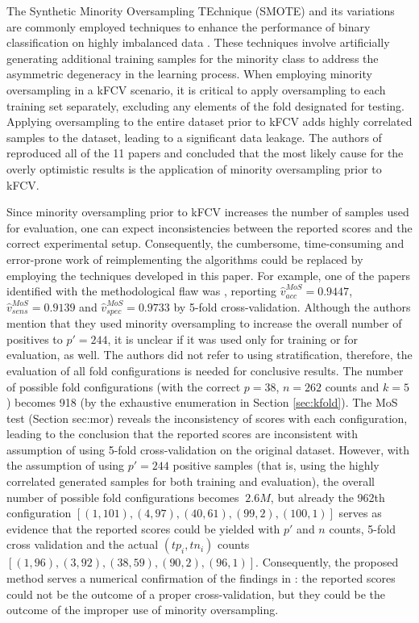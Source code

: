 \documentclass[3p, times]{elsarticle}
\begin{document}
The Synthetic Minority Oversampling TEchnique (SMOTE) \cite{smote} and its variations are commonly employed techniques to enhance the performance of binary classification on highly imbalanced data \cite{add2}. These techniques involve artificially generating additional training samples for the minority class to address the asymmetric degeneracy in the learning process. When employing minority oversampling in a kFCV scenario, it is critical to apply oversampling to each training set separately, excluding any elements of the fold designated for testing. Applying oversampling to the entire dataset prior to kFCV adds highly correlated samples to the dataset, leading to a significant data leakage. The authors of \cite{ehg} reproduced all of the 11 papers and concluded that the most likely cause for the overly optimistic results is the application of minority oversampling prior to kFCV.

Since minority oversampling prior to kFCV increases the number of samples used for evaluation, one can expect inconsistencies between the reported scores and the correct experimental setup. Consequently, the cumbersome, time-consuming and error-prone work of reimplementing the algorithms could be replaced by employing the techniques developed in this paper. For example, one of the papers identified with the methodological flaw was \cite{ehgflaw2}, reporting $\hat{v}_{acc}^{MoS} = 0.9447$, $\hat{v}_{sens}^{MoS} = 0.9139$ and $\hat{v}_{spec}^{MoS} = 0.9733$ by 5-fold cross-validation. Although the authors mention that they used minority oversampling to increase the overall number of positives to $p'=244$, it is unclear if it was used only for training or for evaluation, as well.
The authors did not refer to using stratification, therefore, the evaluation of all fold configurations is needed for conclusive results. The number of possible fold configurations (with the correct $p=38$, $n=262$ counts and $k=5$) becomes 918 (by the exhaustive enumeration in Section \ref{sec:kfold}). The MoS test (Section {sec:mor}) reveals the inconsistency of scores with each configuration, leading to the conclusion that the reported scores are inconsistent with assumption of using 5-fold cross-validation on the original dataset. However, with the assumption of using $p'=244$ positive samples (that is, using the highly correlated generated samples for both training and evaluation), the overall number of possible fold configurations becomes $~2.6M$, but already the 962th configuration $[(1, 101), (4, 97), (40, 61), (99, 2), (100, 1)]$ serves as evidence that the reported scores could be yielded with $p'$ and $n$ counts, 5-fold cross validation and the actual $(tp_i, tn_i)$ counts $[(1, 96), (3, 92), (38, 59), (90, 2), (96, 1)]$. Consequently, the proposed method serves a numerical confirmation of the findings in \cite{ehg}: the reported scores could not be the outcome of a proper cross-validation, but they could be the outcome of the improper use of minority oversampling.
\end{document}
